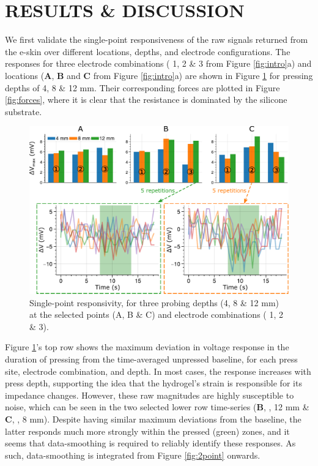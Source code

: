 \section{RESULTS \& DISCUSSION} \label{sec:results}

We first validate the single-point responsiveness of the raw signals returned from the e-skin over different locations, depths, and electrode configurations. The responses for three electrode combinations (\textcircled{\raisebox{-.9pt} {1}}, \textcircled{\raisebox{-.9pt} {2}} \& \textcircled{\raisebox{-.9pt} {3}} from Figure \ref{fig:intro}a) and locations (\textbf{A}, \textbf{B} and \textbf{C} from Figure \ref{fig:intro}a) are shown in Figure \ref{fig:single} for pressing depths of 4, 8 \& 12 mm. Their corresponding forces are plotted in Figure \ref{fig:forces}, where it is clear that the resistance is dominated by the silicone substrate.

\begin{figure}[htbp]
  \centering
  \includegraphics[width=\linewidth]{Images/SingleResponse.pdf}
  \caption{Single-point responsivity, for three probing depths (4, 8 \& 12 mm) at the selected points (A, B \& C) and electrode combinations (\textcircled{\raisebox{-.8pt} {1}}, \textcircled{\raisebox{-.8pt} {2}} \& \textcircled{\raisebox{-.8pt} {3}}).}
  \label{fig:single}
\end{figure}

Figure \ref{fig:single}'s top row shows the maximum deviation in voltage response in the duration of pressing from the time-averaged unpressed baseline, for each press site, electrode combination, and depth. In most cases, the response increases with press depth, supporting the idea that the hydrogel's strain is responsible for its impedance changes. However, these raw magnitudes are highly susceptible to noise, which can be seen in the two selected lower row time-series (\textbf{B}, , 12 mm \& \textbf{C}, , 8 mm). Despite having similar maximum deviations from the baseline, the latter responds much more strongly within the pressed (green) zones, and it seems that data-smoothing is required to reliably identify these responses. As such, data-smoothing is integrated from Figure \ref{fig:2point} onwards.

